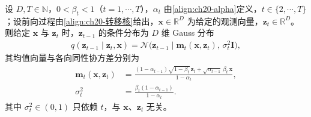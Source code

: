 \documentclass[../../main.tex]{subfiles}
\begin{document}
\begin{proposition}\label{proposition:ch20-逆条件分布}
设 $D,T\in\mathbb{N}$，$0<\beta_{t}<1$（$t=1,\cdots,T$），$\alpha_t$ 由\eqref{align:ch20-alpha}定义，$t\in\{2,\cdots,T\}$；设前向过程由\eqref{align:ch20-转移核}给出，$\bm{x}\in\mathbb{R}^{D}$ 为给定的观测向量，$\bm{z}_{t}\in\mathbb{R}^{D}$。则给定 $\bm{x}$ 与 $\bm{z}_t$ 时，$\bm{z}_{t-1}$ 的条件分布为 $D$ 维 Gauss 分布
\begin{align}
q(\bm{z}_{t-1}\mid\bm{z}_t,\bm{x})=\mathcal{N}\big(\bm{z}_{t-1}\mid\bm{m}_t(\bm{x},\bm{z}_t),\,\sigma_t^2\bm{I}\big),
\label{align:ch20-逆条件}
\end{align}
其均值向量与各向同性协方差分别为
\begin{align}
\bm{m}_t(\bm{x},\bm{z}_t)&=\frac{(1-\alpha_{t-1})\sqrt{1-\beta_t}\,\bm{z}_t+\sqrt{\alpha_{t-1}}\,\beta_t\,\bm{x}}{1-\alpha_t},
\label{align:ch20-逆均值}\\
\sigma_t^2&=\frac{\beta_t(1-\alpha_{t-1})}{1-\alpha_t}.
\label{align:ch20-逆方差}
\end{align}
其中 $\sigma_t^2\in(0,1)$ 只依赖 $t$，与 $\bm{x}$、$\bm{z}_t$ 无关。
\end{proposition}
\end{document}
